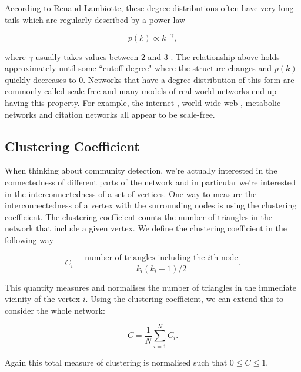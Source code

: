According to Renaud Lambiotte, these degree distributions often have very long tails which are regularly described by a power law

$$ p(k) \propto k^{-\gamma}, $$

\noindent
where $\gamma$ usually takes values between $2$ and $3$ \cite[p. 16]{oxford:renaud_notes}. The relationship above holds approximately until some ``cutoff degree" where the structure changes and $p(k)$ quickly decreases to $0$. Networks that have a degree distribution of this form are commonly called scale-free and many models of real world networks end up having this property. For example, the internet \cite{PhysRevE.65.066130}, world wide web \cite{BARABASI200069}, metabolic networks \cite{Jeong2000} and citation networks \cite{Redner1998} all appear to be scale-free.

\subsection{Clustering Coefficient}
When thinking about community detection, we're actually interested in the connectedness of different parts of the network and in particular we're interested in the interconnectedness of a set of vertices. One way to measure the interconnectedness of a vertex with the surrounding nodes is using the clustering coefficient. The clustering coefficient counts the number of triangles in the network that include a given vertex. We define the clustering coefficient in the following way

$$ C_i = \frac{\text{number of triangles including the }i\text{th node}}{k_i(k_i-1)/2}. $$

This quantity measures and normalises the number of triangles in the immediate vicinity of the vertex $i$. Using the clustering coefficient, we can extend this to consider the whole network:

$$ C = \frac{1}{N}\sum_{i=1}^NC_i. $$

\noindent
Again this total measure of clustering is normalised such that $0 \leq C \leq 1$.


